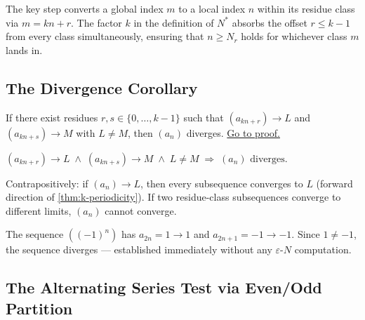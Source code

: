 \begin{remark}
The key step converts a global index $m$ to a local index $n$ within its
residue class via $m = kn + r$. The factor $k$ in the definition of $N^*$
absorbs the offset $r \leq k-1$ from every class simultaneously, ensuring
that $n \geq N_r$ holds for whichever class $m$ lands in.
\end{remark}

\subsection*{The Divergence Corollary}
\label{subsec:residue-divergence}

\begin{proposition}
\label{prop:residue-divergence}
If there exist residues $r, s \in \{0,\ldots,k-1\}$ such that
$(a_{kn+r}) \to L$ and $(a_{kn+s}) \to M$ with $L \neq M$, then
$(a_n)$ diverges.
\hyperref[prf:residue-divergence]{Go to proof.}
\end{proposition}

\begin{remark*}
\end{remark*}


\begin{remark}
$(a_{kn+r}) \to L \;\land\; (a_{kn+s}) \to M \;\land\; L \neq M
\;\Rightarrow\; (a_n) \text{ diverges}$.
\end{remark}

\begin{remark}
Contrapositively: if $(a_n) \to L$, then every subsequence converges to
$L$ (forward direction of \cref{thm:k-periodicity}). If two residue-class
subsequences converge to different limits, $(a_n)$ cannot converge.
\end{remark}

\begin{remark}
The sequence $((-1)^n)$ has $a_{2n} = 1 \to 1$ and $a_{2n+1} = -1 \to -1$.
Since $1 \neq -1$, the sequence diverges --- established immediately without
any $\varepsilon$-$N$ computation.
\end{remark}

\subsection*{The Alternating Series Test via Even/Odd Partition}
\label{subsec:ast-even-odd}

